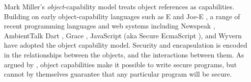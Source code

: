 Mark Miller's \cite{MillerPhD}
\textit{object}-capability model treats
object references
as capabilities. 
Building on early object-capability languages such as E
\cite{MillerPhD,ELang} and Joe-E \cite{JoeE}, 
a range of recent programming languages and web systems
\cite{CapJavaHayesAPLAS17,CapNetSocc17Eide,DOCaT14} including Newspeak
\cite{newspeak17},
AmbientTalk \cite{ambientTalk}
Dart \cite{dart15}, Grace \cite{grace,graceClasses},
JavaScript (aka Secure EcmaScript \cite{miller-esop2013}),
and Wyvern \cite{wyverncapabilities} have adopted the object
capability model.
Security  and encapsulation 
is encoded in the relationships between the objects, and the interactions between them.
 As argued by \citet{capeFTfJP}, %
 object capabilities
 make it possible to write secure
  programs,
  but cannot by themselves guarantee that any particular program
  will be secure.
%


